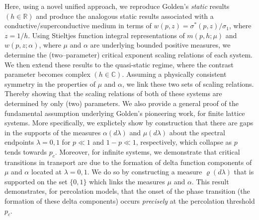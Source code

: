 \documentclass[english,12pt,jmp,graphicx]{revtex4-1}
\begin{document}
Here, using a novel unified approach, we reproduce Golden's
\emph{static} results $(h\in\mathbb{R})$ and produce the analogous
static results associated with a conductive/superconductive medium in
terms of $w(p,z)=\sigma^*(p,z)/\sigma_1$, where $z=1/h$. Using Stieltjes
function integral representations of $m(p,h;\mu)$ and $w(p,z;\alpha)$, where
$\mu$ and $\alpha$ are underlying bounded positive measures, we determine the
(two--parameter) critical exponent scaling relations of each
system. We then extend these results to the quasi-static regime, where
the contrast parameter becomes complex $(h\in\mathbb{C})$.
Assuming a physically consistent symmetry in the properties
of $\mu$ and $\alpha$, we link these two sets of scaling relations. Thereby
showing that the scaling relations of both of
these systems are determined by only (two) parameters. We also provide
a general proof of the fundamental assumption underlying Golden's
pioneering work, for finite lattice systems. More specifically, we
explictely show by construction that there are gaps in the supports
of the measures $\alpha(d\lambda)$ and $\mu(d\lambda)$ about the spectral endpoints
$\lambda=0,1$ for $p\ll1$ and $1-p\ll1$, respectively, which collapse as $p$
tends towards $p_c$. Moreover, for infinite systems, we demonstrate
that critical transitions in transport are due to the formation of
delta function components of $\mu$ and $\alpha$ located at $\lambda=0,1$. We do so
by constructing a measure $\varrho(d\lambda)$ that is supported on the set
$\{0,1\}$ which links the measures $\mu$ and $\alpha$. This result
demonstrates, for percolation models, that the onset of the phase
transition (the formation of these delta components) occurs
\emph{precisely} at the percolation threshold $p_c$.         
%
%
\end{document}
